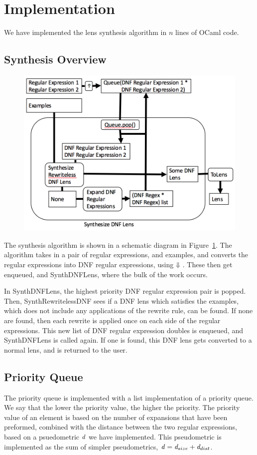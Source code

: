 \documentclass[numbers]{sigplanconf}
\begin{document}
\section{Implementation}
We have implemented the lens synthesis algorithm in $n$ lines of OCaml code.

\subsection{Synthesis Overview}
\begin{figure}
\includegraphics[scale=.5]{synth-lens-schematic.png}
\label{fig:synth-lens-schematic}
\end{figure}
The synthesis algorithm is shown in a schematic diagram in 
Figure~\ref{fig:synth-lens-schematic}.  The algorithm takes in a pair of
regular expressions, and examples, and converts the regular expressions into
DNF regular expressions, using $\Downarrow{}$.
These then get enqueued, and SynthDNFLens, where the bulk of the work
occurs.

In SynthDNFLens, the highest priority DNF regular expression pair is popped.
Then, SynthRewritelessDNF sees if a DNF lens which satisfies the examples, which
does not include any applications of the rewrite rule, can be found.
If none are found, then each rewrite is applied once on each side of the regular
expressions.
This new list of DNF regular expression doubles is enqueued, and SynthDNFLens is
called again.
If one is found, this DNF lens gets converted to a normal lens, and is returned
to the user.

\subsection{Priority Queue}
The priority queue is implemented with a list implementation of a priority queue.
We say that the lower the priority value, the higher the priority.
The priority value of an element is based on the number of expansions that have been
preformed, combined with the distance between the two regular expressions, based
on a psuedometric $\mathit{d}$ we have implemented.  This pseudometric is implemented
as the sum of simpler pseudometrics,
$\mathit{d} = \mathit{d}_{size}+\mathit{d}_{dist}$.
\end{document}
